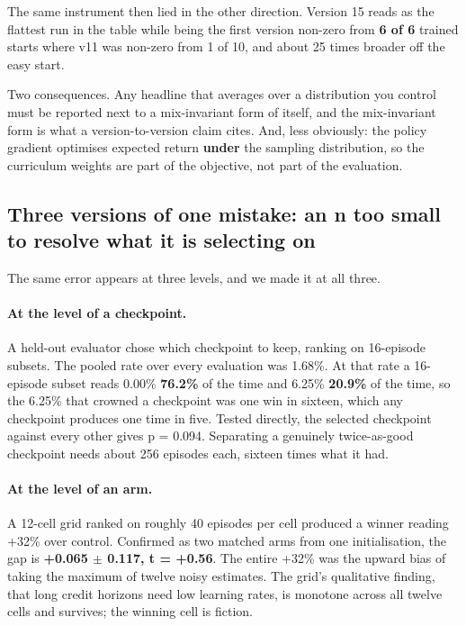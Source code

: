 \documentclass[11pt]{article}
\begin{document}
The same instrument then lied in the other direction. Version 15 reads as the flattest run in the table while being the first version non-zero from \textbf{6 of 6} trained starts where v11 was non-zero from 1 of 10, and about 25 times broader off the easy start.

Two consequences. Any headline that averages over a distribution you control must be reported next to a mix-invariant form of itself, and the mix-invariant form is what a version-to-version claim cites. And, less obviously: the policy gradient optimises expected return \textbf{under} the sampling distribution, so the curriculum weights are part of the objective, not part of the evaluation.

\subsection{Three versions of one mistake: an n too small to resolve what it is selecting on}
\label{sec:9.3}

The same error appears at three levels, and we made it at all three.

\paragraph{At the level of a checkpoint.} A held-out evaluator chose which checkpoint to keep, ranking on 16-episode subsets. The pooled rate over every evaluation was 1.68\%. At that rate a 16-episode subset reads 0.00\% \textbf{76.2\%} of the time and 6.25\% \textbf{20.9\%} of the time, so the 6.25\% that crowned a checkpoint was one win in sixteen, which any checkpoint produces one time in five. Tested directly, the selected checkpoint against every other gives p = 0.094. Separating a genuinely twice-as-good checkpoint needs about 256 episodes each, sixteen times what it had.

\paragraph{At the level of an arm.} A 12-cell grid ranked on roughly 40 episodes per cell produced a winner reading +32\% over control. Confirmed as two matched arms from one initialisation, the gap is \textbf{+0.065 $\pm$ 0.117, t = +0.56}. The entire +32\% was the upward bias of taking the maximum of twelve noisy estimates. The grid's qualitative finding, that long credit horizons need low learning rates, is monotone across all twelve cells and survives; the winning cell is fiction.
\end{document}
